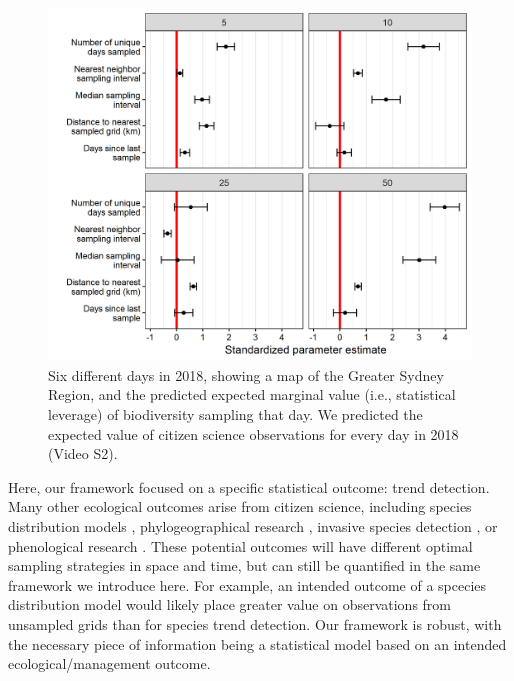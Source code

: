 \documentclass[9pt,twocolumn,twoside,lineno]{pnas-new}
\begin{document}
\begin{figure}[!hb]
\centering
\includegraphics[width=.8\linewidth]{param_estimates.png}
\caption{Six different days in 2018, showing a map of the Greater Sydney Region, and the predicted expected marginal value (i.e., statistical leverage) of biodiversity sampling that day. We predicted the expected value of citizen science observations for every day in 2018 (Video S2).}
\label{fig3}
\end{figure}

Here, our framework focused on a specific statistical outcome: trend detection. Many other ecological outcomes arise from citizen science, including species distribution models \cite{bradsworth2017species, van2013opportunistic}, phylogeographical research \cite{bahls2014new, drury2019continent}, invasive species detection \cite{pocock2017citizen, grason2018citizen}, or phenological research \cite{la2014role, supp2015citizen}. These potential outcomes will have different optimal sampling strategies in space and time, but can still be quantified in the same framework we introduce here. For example, an intended outcome of a spcecies distribution model would likely place greater value on observations from unsampled grids \cite{crawley2001scale} than for species trend detection. Our framework is robust, with the necessary piece of information being a statistical model based on an intended ecological/management outcome.
\end{document}
